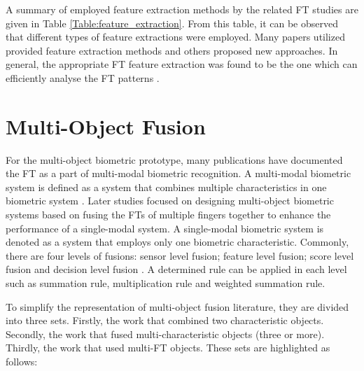 \documentclass[review]{elsarticle}
\begin{document}
	A summary of employed feature extraction methods by the related FT studies are given in Table \ref{Table:feature_extraction}. From this table, it can be observed that different types of feature extractions were employed. Many papers utilized provided feature extraction methods and others proposed new approaches. In general, the appropriate FT feature extraction was found to be the one which can efficiently analyse the FT patterns \cite{kumar2011contactless,Kumar2012Human,sankaran2015Onsmartphone,Al-Nima2017Robust,Al-Nima2017efficient,Al-Nima2017finger}. 
 
\section{Multi-Object Fusion}
	For the multi-object biometric prototype, many publications have documented the FT as a part of multi-modal biometric recognition. A multi-modal biometric system is defined as a system that combines multiple characteristics in one biometric system \cite{ISO2012Information}. Later studies focused on designing multi-object biometric systems based on fusing the FTs of multiple fingers together to enhance the performance of a single-modal system. A single-modal biometric system is denoted as a system that employs only one biometric characteristic. Commonly, there are four levels of fusions: sensor level fusion; feature level fusion; score level fusion and decision level fusion \cite{almahafzah2012multibiometric}. A determined rule can be applied in each level such as summation rule, multiplication rule and weighted summation rule. 

	To simplify the representation of multi-object fusion literature, they are divided into three sets. Firstly, the work that combined two characteristic objects. Secondly, the work that fused multi-characteristic objects (three or more). Thirdly, the work that used multi-FT objects. These sets are highlighted as follows:
\end{document}
